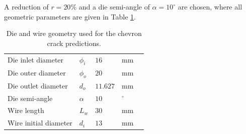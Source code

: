 \documentclass[sn-mathphys,Numbered]{sn-jnl}%
\begin{document}
A reduction of $r = 20\%$ and a die semi-angle of $\alpha = 10^{\circ}$ are chosen, where all geometric parameters are given in Table \ref{tab:chevron_geom}.
\begin{table}[htb]
	\centering
		\begin{tabular}{lllll} \hline
		    Die inlet diameter & $\phi_i$ & $16$ & mm \\
		    Die outer diameter & $\phi_o$ & $20$ & mm \\
	      	    Die outlet diameter & $d_o$ & $11.627$ & mm \\
		    Die semi-angle & $\alpha$ &  $10$ & $^{\circ}$ \\
		    Wire length & $L_w$ & $30$ & mm \\
		    Wire initial diameter & $d_i$ & $13$ & mm \\
		    \hline
		\end{tabular}
	\caption{Die and wire geometry used for the chevron crack predictions.}
	\label{tab:chevron_geom}
\end{table}

\end{document}
